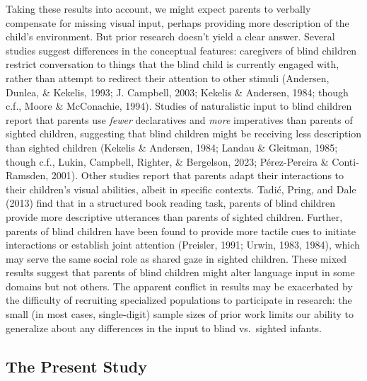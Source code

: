 \documentclass[
  man]{apa6}
\begin{document}
Taking these results into account, we might expect parents to verbally compensate for missing visual input, perhaps providing more description of the child's environment. But prior research doesn't yield a clear answer. Several studies suggest differences in the conceptual features: caregivers of blind children restrict conversation to things that the blind child is currently engaged with, rather than attempt to redirect their attention to other stimuli (Andersen, Dunlea, \& Kekelis, 1993; J. Campbell, 2003; Kekelis \& Andersen, 1984; though c.f., Moore \& McConachie, 1994). Studies of naturalistic input to blind children report that parents use \emph{fewer} declaratives and \emph{more} imperatives than parents of sighted children, suggesting that blind children might be receiving less description than sighted children (Kekelis \& Andersen, 1984; Landau \& Gleitman, 1985; though c.f., Lukin, Campbell, Righter, \& Bergelson, 2023; Pérez-Pereira \& Conti-Ramsden, 2001). Other studies report that parents adapt their interactions to their children's visual abilities, albeit in specific contexts. Tadić, Pring, and Dale (2013) find that in a structured book reading task, parents of blind children provide more descriptive utterances than parents of sighted children. Further, parents of blind children have been found to provide more tactile cues to initiate interactions or establish joint attention (Preisler, 1991; Urwin, 1983, 1984), which may serve the same social role as shared gaze in sighted children. These mixed results suggest that parents of blind children might alter language input in some domains but not others. The apparent conflict in results may be exacerbated by the difficulty of recruiting specialized populations to participate in research: the small (in most cases, single-digit) sample sizes of prior work limits our ability to generalize about any differences in the input to blind vs.~sighted infants.

\hypertarget{the-present-study}{%
\subsection{The Present Study}\label{the-present-study}}
\end{document}
